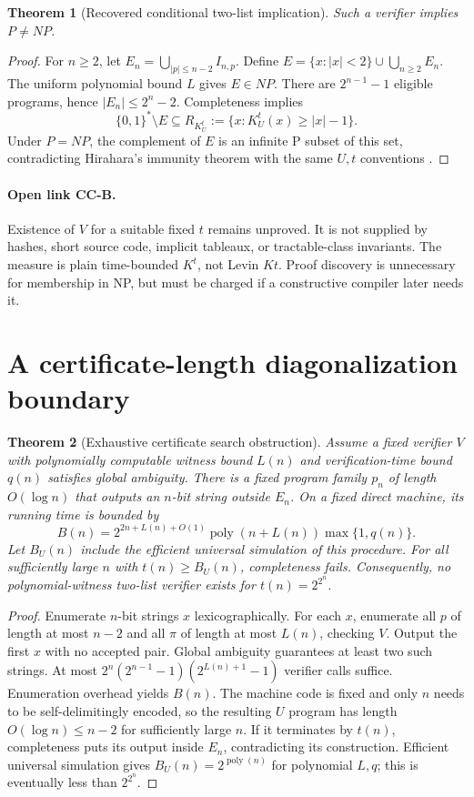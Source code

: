 \documentclass[11pt]{article}
\newtheorem{theorem}{Theorem}
\begin{document}
\begin{theorem}[Recovered conditional two-list implication]
Such a verifier implies $P\ne NP$.
\end{theorem}
\begin{proof}
For $n\ge2$, let $E_n=\bigcup_{|p|\le n-2}I_{n,p}$. Define
$E=\{x:|x|<2\}\cup\bigcup_{n\ge2}E_n$. The uniform polynomial bound $L$
gives $E\in NP$. There are $2^{n-1}-1$ eligible programs, hence
$|E_n|\le2^n-2$. Completeness implies
\[
 \{0,1\}^*\setminus E\subseteq
 R_{K_U^t}:=\{x:K_U^t(x)\ge |x|-1\}.
\]
Under $P=NP$, the complement of $E$ is an infinite P subset of this set,
contradicting Hirahara's immunity theorem with the same $U,t$ conventions
\cite[Theorem 3.9]{hirahara2020}.
\end{proof}
\paragraph{Open link CC-B.} Existence of $V$ for a suitable fixed $t$ remains
unproved. It is not supplied by hashes, short source code, implicit tableaux,
or tractable-class invariants. The measure is plain time-bounded $K^t$, not
Levin $Kt$. Proof discovery is unnecessary for membership in NP, but must be
charged if a constructive compiler later needs it.

\section{A certificate-length diagonalization boundary}
\begin{theorem}[Exhaustive certificate search obstruction]
Assume a fixed verifier $V$ with polynomially computable witness bound $L(n)$
and verification-time bound $q(n)$ satisfies global ambiguity. There is a
fixed program family $p_n$ of length $O(\log n)$ that outputs an $n$-bit
string outside $E_n$. On a fixed direct machine, its running time is bounded
by
\[
 B(n)=2^{2n+L(n)+O(1)}\operatorname{poly}(n+L(n))\max\{1,q(n)\}.
\]
Let $B_U(n)$ include the efficient universal simulation of this procedure.
For all sufficiently large $n$ with $t(n)\ge B_U(n)$, completeness fails.
Consequently, no polynomial-witness two-list verifier exists for
$t(n)=2^{2^n}$.
\end{theorem}
\begin{proof}
Enumerate $n$-bit strings $x$ lexicographically. For each $x$, enumerate all
$p$ of length at most $n-2$ and all $\pi$ of length at most $L(n)$, checking
$V$. Output the first $x$ with no accepted pair. Global ambiguity guarantees
at least two such strings. At most $2^n(2^{n-1}-1)(2^{L(n)+1}-1)$ verifier
calls suffice. Enumeration overhead yields $B(n)$.
The machine code is fixed and only $n$ needs to be self-delimitingly encoded,
so the resulting $U$ program has length $O(\log n)\le n-2$ for sufficiently
large $n$. If it terminates by $t(n)$, completeness puts its output inside
$E_n$, contradicting its construction. Efficient universal simulation gives
$B_U(n)=2^{\operatorname{poly}(n)}$ for polynomial $L,q$; this is eventually
less than $2^{2^n}$.
\end{proof}
\end{document}
